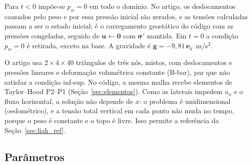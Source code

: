 \documentclass[11pt,a4paper]{article}
\newcommand{\vu}{\bm u}
\newcommand{\vg}{\bm g}
\newcommand{\tsig}{\bm\sigma}
\begin{document}
Para $t<0$ impõe-se $p_w=0$ em todo o domínio. No artigo, os deslocamentos causados pelo
peso e por essa pressão inicial são zerados, e as tensões calculadas passam a ser o estado
inicial: é o carregamento geostático do código com as pressões congeladas, seguido de
$\vu\leftarrow\bm 0$ com $\tsig'$ mantida. Em $t=0$ a condição $p_w=0$ é retirada, exceto na
base. A gravidade é $\vg=-9{,}81\,\bm e_y$~m/s$^2$.

O artigo usa $2\times4\times40$ triângulos de três nós, mistos, com deslocamentos e pressões
lineares e deformação volumétrica constante (B-bar), par que não satisfaz a condição
inf-sup. No código, a mesma malha recebe elementos de Taylor--Hood P2--P1
(Seção~\ref{sec:elementos}). Como as laterais impedem $u_x$ e o fluxo horizontal, a solução
não depende de $x$: o problema é unidimensional (oedométrico), e a tensão total vertical em
cada ponto não muda no tempo, porque o peso é constante e o topo é livre. Isso permite a
referência da Seção~\ref{sec:liak_ref}.

\subsection{Parâmetros}
\label{sec:liak_par}
\end{document}
